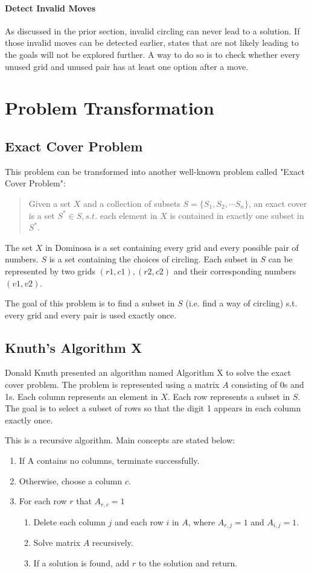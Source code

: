 \documentclass[12pt]{article}
\begin{document}
\paragraph*{Detect Invalid Moves}
As discussed in the prior section, invalid circling can never lead to a solution. If those invalid moves can be detected earlier, states that are not likely leading to the goals will not be explored further. A way to do so is to check whether every unused grid and unused pair has at least one option after a move.

\section{Problem Transformation}
\subsection*{Exact Cover Problem}
This problem can be transformed into another well-known problem called "Exact Cover Problem":
\begin{quote}
	Given a set $X$ and a collection of subsets $S=\{S_1,S_2,\cdots S_n\}$, an exact cover is a set $S^*\in S, s.t.$ each element in $X$ is contained in exactly one subset in $S^*$.
\end{quote}
The set $X$ in Dominosa is a set containing every grid and every possible pair of numbers. $S$ is a set containing the choices of circling. Each subset in $S$ can be represented by two grids $(r1, c1),(r2,c2)$ and their corresponding numbers $(v1,v2)$.

The goal of this problem is to find a subset in $S$ (i.e. find a way of circling) s.t. every grid and every pair is used exactly once.

\subsection*{Knuth's Algorithm X}
Donald Knuth presented an algorithm named Algorithm X to solve the exact cover problem. The problem is represented using a matrix $A$ consisting of 0s and 1s. Each column represents an element in $X$. Each row represents a subset in $S$. The goal is to select a subset of rows so that the digit 1 appears in each column exactly once.

This is a recursive algorithm. Main concepts are stated below:
\begin{enumerate}
	\item If A contains no columns, terminate successfully.
	\item Otherwise, choose a column $c$.
	\item For each row $r$ that $A_{r,c}=1$
	\begin{enumerate}
		\item Delete each column $j$ and each row $i$ in $A$, where $A_{r,j}=1$ and $A_{i,j}=1$.
		\item Solve matrix $A$ recursively.
		\item If a solution is found, add $r$ to the solution and return.
	\end{enumerate}
\end{enumerate}
\end{document}

